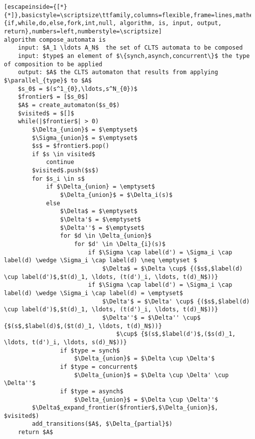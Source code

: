 \renewcommand{\ttdefault}{pcr}
\begin{lstlisting}[escapeinside={[*}{*]},basicstyle=\scriptsize\ttfamily,columns=flexible,frame=lines,mathescape=true,xleftmargin=3.0ex,keywordstyle=\textbf,morekeywords={if,while,do,else,fork,int,null, algorithm, is, input, output, return},numbers=left,numberstyle=\scriptsize]
algorithm compose_automata is
	input: $A_1 \ldots A_N$  the set of CLTS automata to be composed
	input: $type$ an element of $\{synch,asynch,concurrent\}$ the type of composition to be applied
	output: $A$ the CLTS automaton that results from applying $\parallel_{type}$ to $A$
	$s_0$ = $(s^1_{0},\ldots,s^N_{0})$
	$frontier$ = [$s_0$]
	$A$ = create_automaton($s_0$)
	$visited$ = $[]$
	while(|$frontier$| > 0)
		$\Delta_{union}$ = $\emptyset$
		$\Sigma_{union}$ = $\emptyset$		
		$s$ = $frontier$.pop()
		if $s \in visited$
			continue
		$visited$.push($s$)
		for $s_i \in s$ 
			if $\Delta_{union} = \emptyset$
				$\Delta_{union}$ = $\Delta_i(s)$
			else 
				$\Delta$ = $\emptyset$
				$\Delta'$ = $\emptyset$
				$\Delta''$ = $\emptyset$
				for $d \in \Delta_{union}$
					for $d' \in \Delta_{i}(s)$
						if $\Sigma \cap label(d') = \Sigma_i \cap label(d) \wedge \Sigma_i \cap label(d) \neq \emptyset $
							$\Delta$ = $\Delta \cup$ {($s$,$label(d) \cup label(d')$,$t(d)_1, \ldots, (t(d')_i, \ldots, t(d)_N$))}
						if $\Sigma \cap label(d') = \Sigma_i \cap label(d) \wedge \Sigma_i \cap label(d) = \emptyset$
							$\Delta'$ = $\Delta' \cup$ {($s$,$label(d) \cup label(d')$,$t(d)_1, \ldots, (t(d')_i, \ldots, t(d)_N$))}
							$\Delta''$ = $\Delta'' \cup$ {$(s$,$label(d)$,($t(d)_1, \ldots, t(d)_N$))} 
								$\cup$ {$(s$,$label(d')$,($s(d)_1, \ldots, t(d')_i, \ldots, s(d)_N$))}
				if $type = synch$
					$\Delta_{union}$ = $\Delta \cup \Delta'$
				if $type = concurrent$
					$\Delta_{union}$ = $\Delta \cup \Delta' \cup \Delta''$					
				if $type = asynch$
					$\Delta_{union}$ = $\Delta \cup \Delta''$					
		$\Delta$_expand_frontier($frontier$,$\Delta_{union}$, $visited$)				
		add_transitions($A$, $\Delta_{partial}$)
	return $A$

\end{lstlisting}